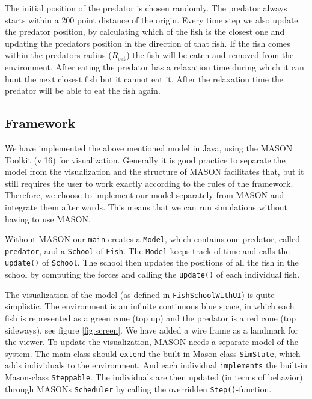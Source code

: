 \documentclass[11pt,a4paper]{article}
\begin{document}
The initial position of the predator is chosen randomly. The predator always starts within a 200 point distance of the origin. 
Every time step we also update the predator position, by calculating which of the fish is the closest one and updating the predators position in the direction of that fish. If the fish comes within the predators radius ($R_\text{eat}$) the fish will be eaten and removed from the environment. After eating the predator has a relaxation time during which it can hunt the next closest fish but it cannot eat it. After the relaxation time the predator will be able to eat the fish again. 

\subsection{Framework}
We have implemented the above mentioned model in Java, using the MASON Toolkit (v.16) \cite{mason} for visualization. Generally it is good practice to separate the model from the visualization and the structure of MASON facilitates that, but it still requires the user to work exactly according to the rules of the framework. Therefore, we choose to implement our model separately from MASON and integrate them after wards. This means that we can run simulations without having to use MASON.

Without MASON our \texttt{main} creates a \texttt{Model}, which contains one predator, called \texttt{predator}, and a \texttt{School} of \texttt{Fish}. The \texttt{Model} keeps track of time and calls the \texttt{update()} of \texttt{School}. The school then updates the positions of all the fish in the school by computing the forces and calling the \texttt{update()} of each individual fish. 

The visualization of the model (as defined in \texttt{FishSchoolWithUI}) is quite simplistic. The environment is an infinite continuous blue space, in which each fish is represented as a green cone (top up) and the predator %
is a red cone (top sideways), see figure \ref{fig:screen}. We have added a wire frame as a landmark for the viewer. To update the visualization, MASON needs a separate model of the system. The main class should \texttt{extend} the built-in Mason-class \texttt{SimState}, which adds individuals to the environment. And each individual \texttt{implements} the built-in Mason-class \texttt{Steppable}. The individuals are then updated (in terms of behavior) through MASONs \texttt{Scheduler} by calling the overridden \texttt{Step()}-function.
\end{document}
